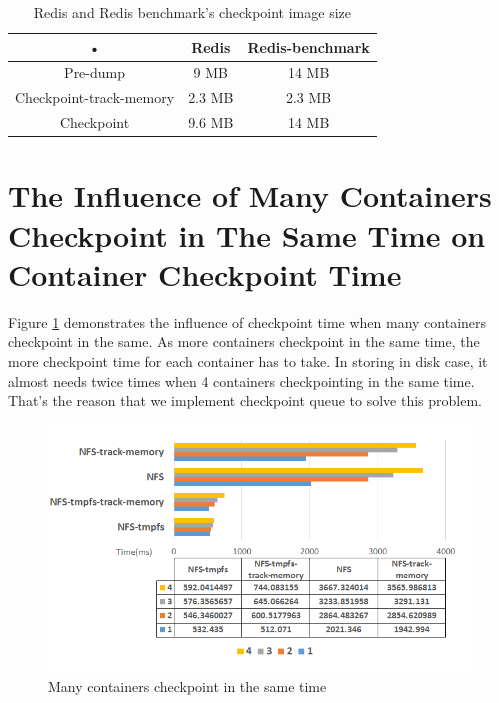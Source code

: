\begin{table}[hbtp]
\begin{center}
\begin{tabular}{|c|c|c|}
\hline 
• & Redis & Redis-benchmark \\ 
\hline 
Pre-dump & 9 MB & 14 MB \\ 
\hline 
Checkpoint-track-memory & 2.3 MB & 2.3 MB \\ 
\hline 
Checkpoint & 9.6 MB & 14 MB \\ 
\hline 
\end{tabular}
\caption{Redis and Redis benchmark's checkpoint image size}
\label{table:redis image size}
\end{center}
\end{table}

\section{The Influence of Many Containers Checkpoint in The Same Time on Container Checkpoint Time}
Figure \ref{fig:many containers} demonstrates the influence of checkpoint time when many containers checkpoint in the same.
As more containers checkpoint in the same time, the more checkpoint time for each container has to take.
In storing in disk case, it almost needs twice times when 4 containers checkpointing in the same time. That's the reason that we implement checkpoint queue to solve this problem.

\begin{figure}[htbp]
\begin{center}
\includegraphics[width=14cm]{figure/many_containers.png}
\end{center}
\caption{Many containers checkpoint in the same time}
\label{fig:many containers}
\end{figure}

